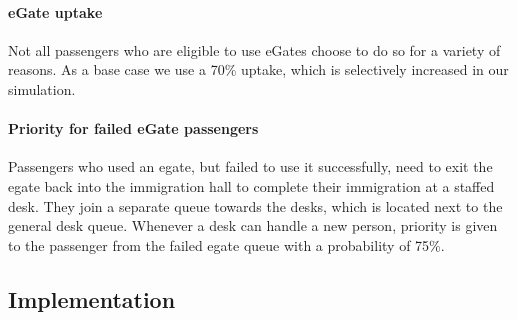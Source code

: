 \documentclass[10pt]{article}
\begin{document}
\paragraph{eGate uptake} 
Not all passengers who are eligible to use eGates choose to do so for a variety of reasons. As a base case we use a 70\% uptake, which is selectively increased in our simulation. 


\paragraph{Priority for failed eGate passengers}
Passengers who used an \gls{egate}, but failed to use it successfully, need to exit the \gls{egate} back into the immigration hall to complete their immigration at a staffed desk. They join a separate queue towards the desks, which is located next to the general desk queue. Whenever a desk can handle a new person, priority is given to the passenger from the failed \gls{egate} queue with a probability of 75\%.


\subsection{Implementation}
\end{document}
